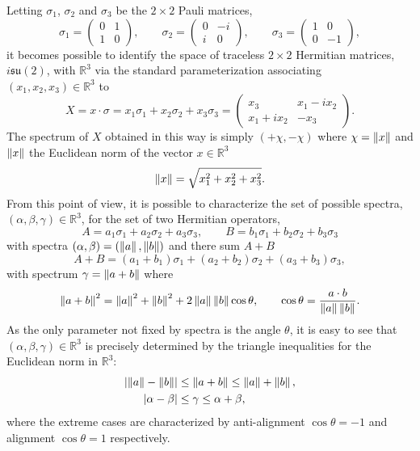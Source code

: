 \documentclass[notitlepage]{article}
\begin{document}
Letting $\sigma_1$, $\sigma_2$ and $\sigma_3$ be the $2 \times 2$ Pauli matrices,
\begin{equation}
    \sigma_1 = \begin{pmatrix} 0 & 1 \\ 1 & 0 \end{pmatrix}, \qquad
    \sigma_2 = \begin{pmatrix} 0 & -i \\ i & 0 \end{pmatrix}, \qquad
    \sigma_3 = \begin{pmatrix} 1 & 0 \\ 0 & -1 \end{pmatrix},
\end{equation}
it becomes possible to identify the space of traceless $2\times 2$ Hermitian matrices, $i\mathfrak{su}(2)$, with $\mathbb R^{3}$ via the standard parameterization associating $(x_1, x_2, x_3) \in \mathbb R^{3}$ to
\begin{equation}
    X = x \cdot \sigma = x_1 \sigma_1 + x_2 \sigma_2 + x_3 \sigma_3 = \begin{pmatrix} x_3 & x_1-ix_2 \\ x_1+ix_2 & -x_3 \end{pmatrix}.
\end{equation}
The spectrum of $X$ obtained in this way is simply $(+\chi, -\chi)$ where $\chi = \left\lVert x\right\rVert$ and $\left\lVert x\right\rVert$ the Euclidean norm of the vector $x \in \mathbb R^3$
\begin{equation}
    \left\lVert x\right\rVert = \sqrt{x_1^2 + x_2^2 + x_3^2}.
\end{equation}
From this point of view, it is possible to characterize the set of possible spectra, $(\alpha, \beta, \gamma) \in \mathbb R^{3}$, for the set of two Hermitian operators,
\begin{equation}
    A = a_1 \sigma_1 + a_2 \sigma_2 + a_3 \sigma_3, \qquad B = b_1 \sigma_1 + b_2 \sigma_2 + b_3 \sigma_3
\end{equation}
with spectra $(\alpha, \beta) = (\left\lVert a\right\rVert, \left\lVert b\right\rVert)$ and there sum $A+B$
\begin{equation}
    A+B = (a_1+b_1) \sigma_1 + (a_2+b_2) \sigma_2 + (a_3+b_3) \sigma_3,
\end{equation}
with spectrum $\gamma = \left\lVert a+b\right\rVert$ where
\begin{equation}
    \left\lVert a+b\right\rVert^2 = \left\lVert a\right\rVert^2 + \left\lVert b\right\rVert^{2} + 2 \left\lVert a\right\rVert \left\lVert b\right\rVert \cos \theta, \qquad \cos \theta = \frac{a \cdot b}{\left\lVert a\right\rVert \left\lVert b\right\rVert}.
\end{equation}
As the only parameter not fixed by spectra is the angle $\theta$, it is easy to see that $(\alpha, \beta, \gamma) \in \mathbb R^3$ is precisely determined by the triangle inequalities for the Euclidean norm in $\mathbb R^3$:
\begin{align}
    \left|\left\lVert a\right\rVert - \left\lVert b\right\rVert\right| &\leq \left\lVert a+b\right\rVert \leq \left\lVert a\right\rVert + \left\lVert b\right\rVert, \\
    \left|\alpha - \beta\right| &\leq \gamma \leq \alpha + \beta,
\end{align}
where the extreme cases are characterized by anti-alignment $\cos \theta = -1$ and alignment $\cos \theta = 1$ respectively.
\end{document}
